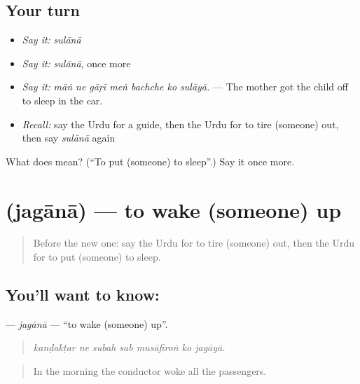 \subsection*{Your turn}
\begin{itemize}
\raggedright
  \item \emph{Say it:} \emph{sulānā}
  \item \emph{Say it:} \emph{sulānā}, once more
  \item \emph{Say it:} \emph{māṅ ne gāṛī meṅ bachche ko sulāyā.} — The mother got the child off to sleep in the car.
  \item \emph{Recall:} say the Urdu for a guide, then the Urdu for to tire (someone) out, then say \emph{sulānā} again
\end{itemize}

\begin{tcolorbox}[breakable,colback=teal!4,colframe=teal!35!black,title={Before you move on}]
What does  mean? (\textquotedblleft{}To put (someone) to sleep\textquotedblright{}.) Say it once more.
\end{tcolorbox}
\section[\texorpdfstring{\ur{جگانا} (jagānā)}{جگانا (jagānā)}]{ (jagānā) — to wake (someone) up}

\label{lesson:UR-C402-jagana}



\begin{quote}
Before the new one: say the Urdu for to tire (someone) out, then the Urdu for to put (someone) to sleep.
\end{quote}

\subsection*{You'll want to know: }
\textbf{} — \emph{jagānā} — \textquotedblleft{}to wake (someone) up\textquotedblright{}.

\begin{quote}
      
\end{quote}

\begin{quote}
\emph{kanḍakṭar ne subah sab musāfiroṅ ko jagāyā.}
\end{quote}

\begin{quote}
In the morning the conductor woke all the passengers.
\end{quote}

